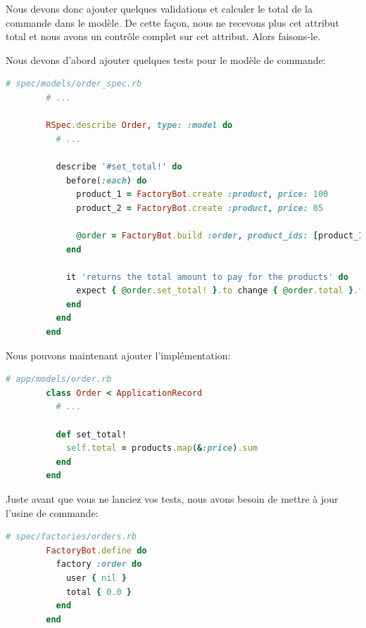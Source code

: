 \documentclass[]{report}
\begin{document}
      Nous devons donc ajouter quelques validations et calculer le total de la commande dans le modèle. De cette façon, nous ne recevons plus cet attribut total et nous avons un contrôle complet sur cet attribut. Alors faisons-le.

      Nous devons d'abord ajouter quelques tests pour le modèle de commande:

      \begin{scriptsize}
        \begin{lstlisting}[language=ruby, caption={Test de la métode du calcul de total de la commande}]
        # spec/models/order_spec.rb
        # ...

        RSpec.describe Order, type: :model do
          # ...

          describe '#set_total!' do
            before(:each) do
              product_1 = FactoryBot.create :product, price: 100
              product_2 = FactoryBot.create :product, price: 85

              @order = FactoryBot.build :order, product_ids: [product_1.id, product_2.id]
            end

            it 'returns the total amount to pay for the products' do
              expect { @order.set_total! }.to change { @order.total }.from(0).to(185)
            end
          end
        end
        \end{lstlisting}
      \end{scriptsize}

      Nous pouvons maintenant ajouter l'implémentation:

      \begin{scriptsize}
        \begin{lstlisting}[language=ruby, caption={Implémentation de la métode du calcul de total de la commande}]
        # app/models/order.rb
        class Order < ApplicationRecord
          # ...

          def set_total!
            self.total = products.map(&:price).sum
          end
        end
        \end{lstlisting}
      \end{scriptsize}

      Juste avant que vous ne lanciez vos tests, nous avons besoin de mettre à jour l'usine de commande:

      \begin{scriptsize}
        \begin{lstlisting}[language=ruby, caption={Implémentation de la métode du calcul de total de la commande}]
        # spec/factories/orders.rb
        FactoryBot.define do
          factory :order do
            user { nil }
            total { 0.0 }
          end
        end
        \end{lstlisting}
      \end{scriptsize}
\end{document}
